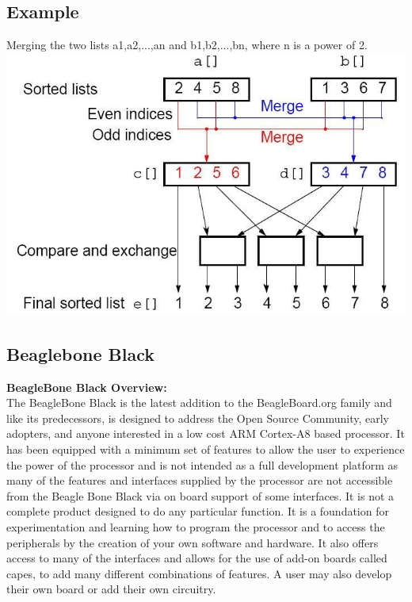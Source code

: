 \documentclass[a4paper,12pt]{article}
\begin{document}
	\subsection{Example}
	Merging the two lists a1,a2,...,an and b1,b2,...,bn, where n is a power of 2. 
	\includegraphics[width=\textwidth]{oddeven_example}
		
	\subsection{Beaglebone Black}
	\textbf{BeagleBone Black Overview:}\\ 
	The BeagleBone Black is the latest addition to the BeagleBoard.org family and like its predecessors, is designed to address the Open Source Community, early adopters, and anyone interested in a low cost ARM Cortex-A8 based processor. It has been equipped with a minimum set of features to allow the user to experience the power of the processor and is not intended as a full development platform as many of the features and interfaces supplied by the processor are not accessible from the Beagle Bone Black via on board support of some interfaces. It is not a complete product designed to do any particular function. It is a foundation for experimentation and learning how to program the processor and to access the peripherals by the creation of your own software and hardware. It also offers access to many of the interfaces and allows for the use of add-on boards called capes, to add many different combinations of features. A user may also develop their own board or add their own circuitry.
	
\end{document}
